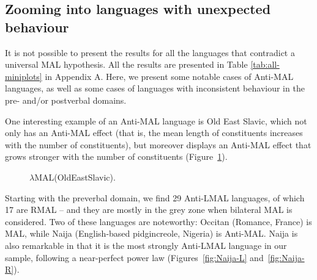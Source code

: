 \subsection{Zooming into languages with unexpected behaviour}\label{zoom}
It is not possible to present the results for all the languages that contradict a universal MAL hypothesis. All the results are presented in Table \ref{tab:all-miniplots} in Appendix A. Here, we present some notable cases of Anti-MAL languages, as well as some cases of languages with inconsistent behaviour in the pre- and/or postverbal domains.

One interesting example of an Anti-MAL language is Old East Slavic, which not only has an Anti-MAL effect (that is, the mean length of constituents increases with the number of constituents), but moreover displays an Anti-MAL effect that grows stronger with the number of constituents (Figure~\ref{fig:OldEastSlavic}).

\begin{figure}[!ht]
\begin{center}
\caption{$\lambda$MAL(OldEastSlavic).}
\label{fig:OldEastSlavic}
\end{center}
\end{figure}

Starting with the preverbal domain, we find 29 Anti-LMAL languages, of which 17 are RMAL -- and they are mostly in the grey zone when bilateral MAL is considered. Two of these languages are noteworthy: Occitan (Romance, France) is MAL, while Naija (English-based pidgincreole, Nigeria) is Anti-MAL. Naija is also remarkable in that it is the most strongly Anti-LMAL language in our sample, following a near-perfect power law (Figures~\ref{fig:Naija-L} and~\ref{fig:Naija-R}).

